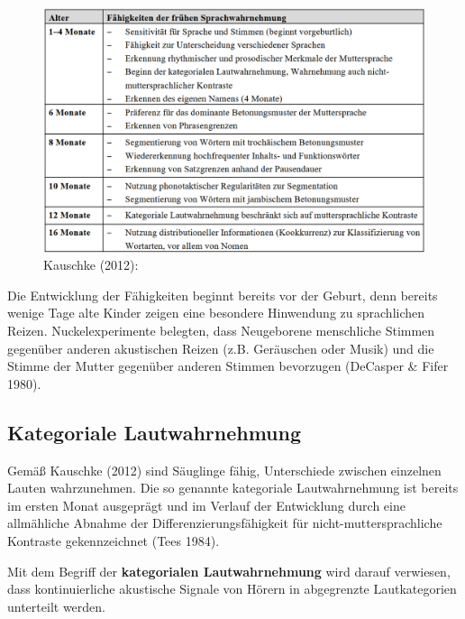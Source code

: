 \documentclass[
  letterpaper,
]{scrbook}
\begin{document}
\begin{figure}

{\centering \includegraphics[width=1\textwidth,height=\textheight]{./pictures/L1_Entwicklung_kauschke_Tab6.png}

}

\caption{Kauschke (2012):}

\end{figure}

Die Entwicklung der Fähigkeiten beginnt bereits vor der Geburt, denn
bereits wenige Tage alte Kinder zeigen eine besondere Hinwendung zu
sprachlichen Reizen. Nuckelexperimente belegten, dass Neugeborene
menschliche Stimmen gegenüber anderen akustischen Reizen (z.B.
Geräuschen oder Musik) und die Stimme der Mutter gegenüber anderen
Stimmen bevorzugen (DeCasper \& Fifer 1980).

\hypertarget{kategoriale-lautwahrnehmung}{%
\subsection{Kategoriale
Lautwahrnehmung}\label{kategoriale-lautwahrnehmung}}

Gemäß Kauschke (2012) sind Säuglinge fähig, Unterschiede zwischen
einzelnen Lauten wahrzunehmen. Die so genannte kategoriale
Lautwahrnehmung ist bereits im ersten Monat ausgeprägt und im Verlauf
der Entwicklung durch eine allmähliche Abnahme der
Differenzierungsfähigkeit für nicht-muttersprachliche Kontraste
gekennzeichnet (Tees 1984).

Mit dem Begriff der \textbf{kategorialen Lautwahrnehmung} wird darauf
verwiesen, dass kontinuierliche akustische Signale von Hörern in
abgegrenzte Lautkategorien unterteilt werden.
\end{document}
